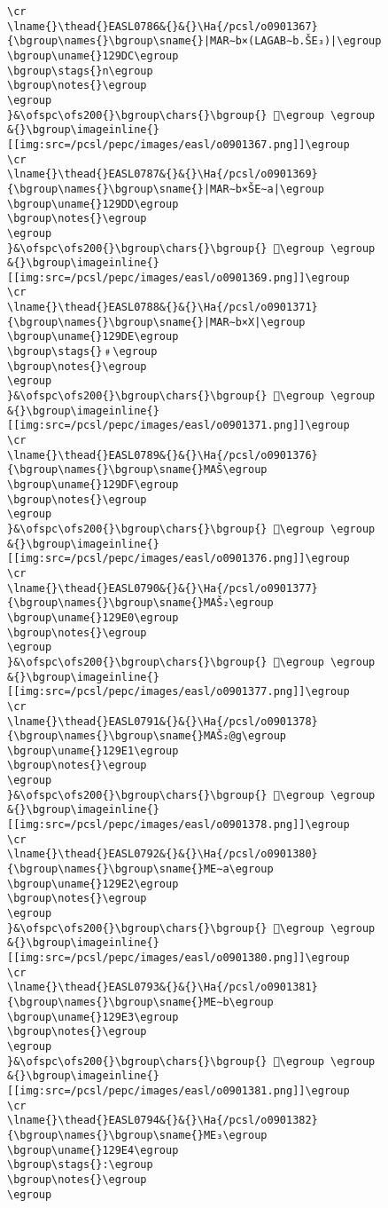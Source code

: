 \begin{verbatim}
\cr
\lname{}\thead{}EASL0786&{}&{}\Ha{/pcsl/o0901367}{\bgroup\names{}\bgroup\sname{}|MAR∼b×(LAGAB∼b.ŠE₃)|\egroup
\bgroup\uname{}129DC\egroup
\bgroup\stags{}n\egroup
\bgroup\notes{}\egroup
\egroup
}&\ofspc\ofs200{}\bgroup\chars{}\bgroup{} 𒧜\egroup \egroup
&{}\bgroup\imageinline{}[[img:src=/pcsl/pepc/images/easl/o0901367.png]]\egroup
\cr
\lname{}\thead{}EASL0787&{}&{}\Ha{/pcsl/o0901369}{\bgroup\names{}\bgroup\sname{}|MAR∼b×ŠE∼a|\egroup
\bgroup\uname{}129DD\egroup
\bgroup\notes{}\egroup
\egroup
}&\ofspc\ofs200{}\bgroup\chars{}\bgroup{} 𒧝\egroup \egroup
&{}\bgroup\imageinline{}[[img:src=/pcsl/pepc/images/easl/o0901369.png]]\egroup
\cr
\lname{}\thead{}EASL0788&{}&{}\Ha{/pcsl/o0901371}{\bgroup\names{}\bgroup\sname{}|MAR∼b×X|\egroup
\bgroup\uname{}129DE\egroup
\bgroup\stags{}﹟\egroup
\bgroup\notes{}\egroup
\egroup
}&\ofspc\ofs200{}\bgroup\chars{}\bgroup{} 𒧞\egroup \egroup
&{}\bgroup\imageinline{}[[img:src=/pcsl/pepc/images/easl/o0901371.png]]\egroup
\cr
\lname{}\thead{}EASL0789&{}&{}\Ha{/pcsl/o0901376}{\bgroup\names{}\bgroup\sname{}MAŠ\egroup
\bgroup\uname{}129DF\egroup
\bgroup\notes{}\egroup
\egroup
}&\ofspc\ofs200{}\bgroup\chars{}\bgroup{} 𒧟\egroup \egroup
&{}\bgroup\imageinline{}[[img:src=/pcsl/pepc/images/easl/o0901376.png]]\egroup
\cr
\lname{}\thead{}EASL0790&{}&{}\Ha{/pcsl/o0901377}{\bgroup\names{}\bgroup\sname{}MAŠ₂\egroup
\bgroup\uname{}129E0\egroup
\bgroup\notes{}\egroup
\egroup
}&\ofspc\ofs200{}\bgroup\chars{}\bgroup{} 𒧠\egroup \egroup
&{}\bgroup\imageinline{}[[img:src=/pcsl/pepc/images/easl/o0901377.png]]\egroup
\cr
\lname{}\thead{}EASL0791&{}&{}\Ha{/pcsl/o0901378}{\bgroup\names{}\bgroup\sname{}MAŠ₂@g\egroup
\bgroup\uname{}129E1\egroup
\bgroup\notes{}\egroup
\egroup
}&\ofspc\ofs200{}\bgroup\chars{}\bgroup{} 𒧡\egroup \egroup
&{}\bgroup\imageinline{}[[img:src=/pcsl/pepc/images/easl/o0901378.png]]\egroup
\cr
\lname{}\thead{}EASL0792&{}&{}\Ha{/pcsl/o0901380}{\bgroup\names{}\bgroup\sname{}ME∼a\egroup
\bgroup\uname{}129E2\egroup
\bgroup\notes{}\egroup
\egroup
}&\ofspc\ofs200{}\bgroup\chars{}\bgroup{} 𒧢\egroup \egroup
&{}\bgroup\imageinline{}[[img:src=/pcsl/pepc/images/easl/o0901380.png]]\egroup
\cr
\lname{}\thead{}EASL0793&{}&{}\Ha{/pcsl/o0901381}{\bgroup\names{}\bgroup\sname{}ME∼b\egroup
\bgroup\uname{}129E3\egroup
\bgroup\notes{}\egroup
\egroup
}&\ofspc\ofs200{}\bgroup\chars{}\bgroup{} 𒧣\egroup \egroup
&{}\bgroup\imageinline{}[[img:src=/pcsl/pepc/images/easl/o0901381.png]]\egroup
\cr
\lname{}\thead{}EASL0794&{}&{}\Ha{/pcsl/o0901382}{\bgroup\names{}\bgroup\sname{}ME₃\egroup
\bgroup\uname{}129E4\egroup
\bgroup\stags{}:\egroup
\bgroup\notes{}\egroup
\egroup

\end{verbatim}
